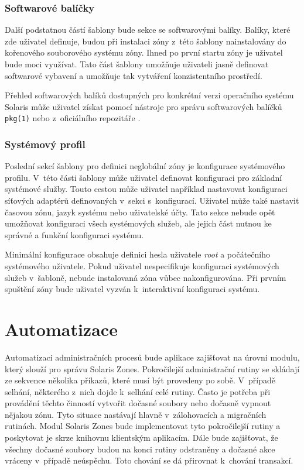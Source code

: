 \subsubsection{Softwarové balíčky}
\label{chapter:design:templates:zones:manifest}
Další podstatnou částí šablony bude sekce se softwarovými balíky. Balíky, které zde uživatel definuje, budou při instalaci
zóny z~této šablony nainstalovány do kořenového souborového systému zóny. Ihned po první startu zóny je uživatel bude moci
využívat. Tato část šablony umožňuje uživateli jasně definovat softwarové vybavení a umožňuje tak vytváření konzistentního
prostředí.

Přehled softwarových balíků dostupných pro konkrétní verzi operačního systému Solaris může uživatel získat pomocí nástroje
pro správu softwarových balíčků \verb|pkg(1)| nebo z~oficiálního repozitáře \cite{oracle:solaris:desing:pkg_repository}.
\subsubsection{Systémový profil}
\label{chapter:design:templates:zones:profile}
Poslední sekcí šablony pro definici neglobální zóny je konfigurace systémového profilu. V~této části šablony může uživatel
definovat konfiguraci pro základní systémové služby. Touto cestou může uživatel například nastavovat konfiguraci síťových
adaptérů definovaných v~sekci s~konfigurací. Uživatel může také nastavit časovou zónu, jazyk systému nebo uživatelské účty.
Tato sekce nebude opět umožňovat konfiguraci všech systémových služeb, ale jejich část nutnou ke správné a funkční konfiguraci
systému.

Minimální konfigurace obsahuje definici hesla uživatele \textit{root} a počátečního systémového uživatele. Pokud uživatel
nespecifikuje konfiguraci systémových služeb v~šabloně, nebude instalovaná zóna vůbec nakonfigurována. Při prvním spuštění
zóny bude uživatel vyzván k~interaktivní konfiguraci systému.
\section{Automatizace}
\label{chapter:design:automation}
Automatizaci administračních procesů bude aplikace zajišťovat na úrovni modulu, který slouží pro správu Solaris Zones. Pokročilejší
administrační rutiny se skládají ze sekvence několika příkazů, které musí být provedeny po sobě. V~případě selhání, některého
z~nich dojde k~selhání celé rutiny. Často je potřeba při provádění těchto činností vytvořit dočasné soubory nebo dočasně 
vypnout nějakou zónu. Tyto situace nastávají hlavně v~zálohovacích a migračních rutinách. Modul Solaris Zones bude implementovat
tyto pokročilejší rutiny a poskytovat je skrze knihovnu klientským aplikacím. Dále bude zajišťovat, že všechny dočasné soubory
budou na konci rutiny odstraněny a dočasné akce vráceny v~případě neúspěchu. Toto chování se dá přirovnat k~chování transakcí.


